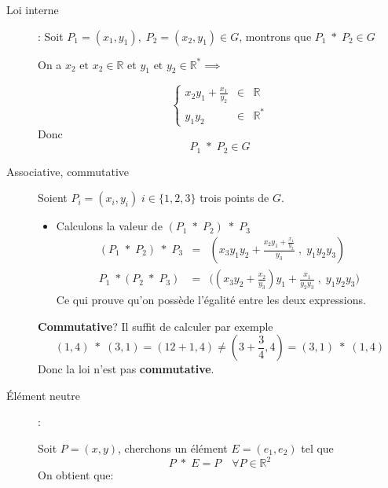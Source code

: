 \documentclass[12pt,a4paper,dvipsnames]{article}
\begin{document}
\begin{description}
    \item[Loi interne]:
        Soit $P_1=(x_1,y_1),\;P_2=(x_2,y_1) \in G$, montrons que $P_1\;*\;
        P_2\in G$

        On a $ x_2 \text{ et } x_2\in \mathbb{R}$  et $y_1 \text{ et } y_2\in
        \mathbb{R}^{*}\implies$

        \begin{equation*}
            \left\{\begin{array}{lll}
                    x_2y_1 +\frac{x_1}{y_2}&\in& \mathbb{R}\\[4pt]
                    y_1y_2 & \in & \mathbb{R}^{*}
                \end{array}\right.
        \end{equation*}
        Donc $$P_1 \;*\;P_2 \in G$$

    \item [Associative, commutative]
        Soient $P_i=(x_i,y_i)\; i\in\{1,2,3\}$ trois points de $G$.
        \begin{itemize}
            \item Calculons la valeur de $(P_1\;*\;P_2)\;*\;P_3$
            \begin{eqnarray}
                (P_1\;*\;P_2)\;*\;P_3  &=& (x_3y_1y_2 + \frac{x_2y_1 +
                \frac{x_1}{y_2}}{y_3}\;,\; y_1y_2y_3) \\
                    P_1\;*(P_2\;*\;P_3)  &=& \big((x_3y_2+\frac{x_2}{y_3})y_1 +
                    \frac{x_1}{y_2y_3}\;,\; y_1y_2y_3\big)
            \end{eqnarray}
            Ce qui prouve qu'on possède l'égalité entre les deux expressions.
        \end{itemize}

        \textbf{Commutative}?
        Il suffit de calculer par exemple
        $$
        (1, 4)\;*\;(3,1) = (12 + 1 ,4)\neq (3+\frac{3}{4},4) = (3,1)\;*\;(1,4)
        $$
        Donc la loi n'est pas \textbf{commutative}.

    \item[Élément neutre]:

        Soit $P=(x,y)$, cherchons un élément $E=(e_1,e_2)$ 
        tel que
        \begin{equation}
            P \;*\; E = P\quad \forall P\in\mathbb{R}^2
        \end{equation}
        On obtient que:


\end{description}
\end{document}
